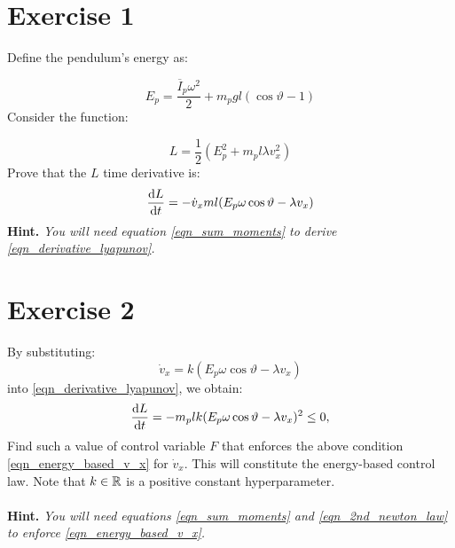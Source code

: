 \documentclass[12pt]{article}
\begin{document}
\section*{Exercise 1}

Define the pendulum's energy as:

$$
E_p =  \frac{\overline{I}_p \omega ^ 2}{2}   + m_p g l (\cos{\vartheta} - 1)
$$
Consider the function:

\begin{equation}
    L = \frac{1}{2}(E_p^2 + m_p l\lambda v_x ^ 2)
\end{equation}
Prove that the $L$ time derivative is: 
\begin{equation}
\label{eqn_derivative_lyapunov}
\frac{\mathop{}\!\mathrm{d} L}{\mathop{}\!\mathrm{d} t} = - \dot{v}_x m l (E_p \omega \cos \vartheta - \lambda v_x)
\end{equation}
\textbf{Hint.} \textit{You will need equation \eqref{eqn_sum_moments} to derive \eqref{eqn_derivative_lyapunov}.}

\section*{Exercise 2}

By substituting:
\begin{equation}
\label{eqn_energy_based_v_x}
\dot{v}_x = k (E_p \omega \cos \vartheta - \lambda v_x)
\end{equation}
into \eqref{eqn_derivative_lyapunov}, we obtain:
$$
\frac{\mathop{}\!\mathrm{d} L}{\mathop{}\!\mathrm{d} t} = - m_p lk (E_p\omega \cos \vartheta  - \lambda v_x)^2 \leq 0,
$$
Find such a value of control variable $F$ that enforces the above condition \eqref{eqn_energy_based_v_x} for $\dot{v}_x$. 
This will constitute the energy-based control law. Note that $k\in {\mathbb{R}}$ is a positive constant hyperparameter.
\\
\\
\textbf{Hint.} \textit{You will need equations \eqref{eqn_sum_moments} and \eqref{eqn_2nd_newton_law} to enforce \eqref{eqn_energy_based_v_x}.}
\end{document}
